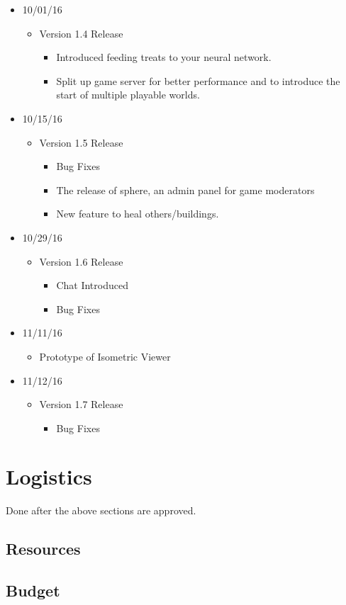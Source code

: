 \documentclass[11pt]{article}
\begin{document}
\begin{itemize}
	\item 10/01/16
		\begin{itemize}
			\item Version 1.4 Release
				\begin{itemize}
					\item Introduced feeding treats to your neural network.
					\item Split up game server for better performance and to introduce the start of multiple playable worlds.
				\end{itemize}
		\end{itemize}
	\item 10/15/16
		\begin{itemize}
			\item Version 1.5 Release
				\begin{itemize}
					\item Bug Fixes
					\item The release of sphere, an admin panel for game moderators
					\item New feature to heal others/buildings.
				\end{itemize}
		\end{itemize}
	\item 10/29/16
		\begin{itemize}
			\item Version 1.6 Release
				\begin{itemize}
					\item Chat Introduced
					\item Bug Fixes
				\end{itemize}
		\end{itemize}
	\item 11/11/16
		\begin{itemize}
			\item Prototype of Isometric Viewer
		\end{itemize}
	\item 11/12/16
		\begin{itemize}
			\item Version 1.7 Release
				\begin{itemize}
					\item Bug Fixes
				\end{itemize}
		\end{itemize}
\end{itemize}

\section{{\color{blue}Logistics}}

Done after the above sections are approved.

\subsection{{\color{blue}Resources}}



\subsection{{\color{blue}Budget}}



\section*{}
\end{document}
